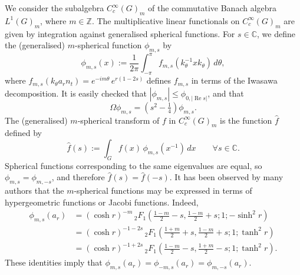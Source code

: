 \documentclass[12pt,a4paper]{amsart}
\theoremstyle{definition}
\theoremstyle{remark}
\numberwithin{equation}{section}
\newcommand{\R}{\mathbb{R}}
\newcommand{\C}{\mathbb{C}}
\newcommand{\Z}{\mathbb{Z}}
\renewcommand{\Re}{\operatorname{Re}}
\newcommand{\Discr}{\mathbb{D}_m}
\newcommand{\eb}{\mathbf{e}}
\newcommand{\var}{s}
\begin{document}
We consider the subalgebra $C^\infty_c(G)_m$ of the commutative Banach algebra $L^1(G)_m$, where $m \in \Z$.
 The multiplicative linear functionals on $C^\infty_c(G)_m$ are given by integration against generalised spherical functions. 
For $\var \in \C$, we define the (generalised) $m$-spherical function $\phi_{m,\var}$ by
\[
\phi_{m,\var}(x) :=  \frac{1}{2\pi} \int_{-\pi}^{\pi}  f_{m,\var}(k_\theta ^{-1}xk_\theta)\, d\theta ,
\]
where $f_{m,\var}(k_\theta a_r n_t)=e^{-im\theta}\, e^{r(1-2\var)}$ defines $f_{m,s}$ in terms of the Iwasawa decomposition. 
%
It is easily checked that $|\phi_{m,\var}|\leq \phi_{0, \left|\Re\var\right|}$, and that
\[
\Omega \phi_{m,\var}=\left(\var^2-\tfrac14\right) \phi_{m,\var} .
\]
The (generalised) $m$-spherical transform of $f$ in $C^\infty_c(G)_m$ is the 
function $\hat f$ defined by
\begin{equation*}%
\hat f(\var) :=\int_G f(x)\, \phi_{m,\var}(x^{-1})\, dx 
\qquad\forall \var\in \C.
\end{equation*}
Spherical functions corresponding to the same eigenvalues are equal, so $\phi_{m,\var}=\phi_{m,-\var}$,  and therefore $\hat f(\var)=\hat f(-\var)$.
It has been observed by many authors \cite{B,Koo,RW} that the $m$-spherical functions may be expressed in terms of hypergeometric functions or Jacobi functions. Indeed,
\begin{equation}\label{eq:hypergeometric}
\begin{aligned}
\phi_{m,\var}(a_r)&=(\cosh r)^{-m}\, {{}_2F_1}\left(\tfrac{1-m}{2}-\var,\tfrac{1-m}{2}+\var;1;-\sinh^2 r\right)
\\
&=(\cosh r)^{-1-2\var}\, {{}_2F_1}\left(\tfrac{1+m}{2}+\var,\tfrac{1-m}{2}+\var;1;\tanh^2 r\right)
\\
&=(\cosh r)^{-1+2\var}\, {{}_2F_1}\left(\tfrac{1-m}{2}-\var,\tfrac{1+m}{2}-\var;1;\tanh^2 r\right).\end{aligned}
\end{equation}
These identities imply that 
$\phi_{m,\var}(a_r)=\phi_{-m,\var}(a_r)=\phi_{m,-\var}(a_r)$.
\end{document}

